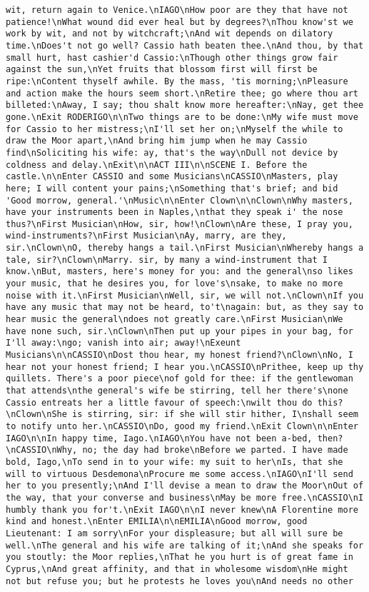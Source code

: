 \begin{verbatim}
wit, return again to Venice.\nIAGO\nHow poor are they that have not patience!\nWhat wound did ever heal but by degrees?\nThou know'st we work by wit, and not by witchcraft;\nAnd wit depends on dilatory time.\nDoes't not go well? Cassio hath beaten thee.\nAnd thou, by that small hurt, hast cashier'd Cassio:\nThough other things grow fair against the sun,\nYet fruits that blossom first will first be ripe:\nContent thyself awhile. By the mass, 'tis morning;\nPleasure and action make the hours seem short.\nRetire thee; go where thou art billeted:\nAway, I say; thou shalt know more hereafter:\nNay, get thee gone.\nExit RODERIGO\n\nTwo things are to be done:\nMy wife must move for Cassio to her mistress;\nI'll set her on;\nMyself the while to draw the Moor apart,\nAnd bring him jump when he may Cassio find\nSoliciting his wife: ay, that's the way\nDull not device by coldness and delay.\nExit\n\nACT III\n\nSCENE I. Before the castle.\n\nEnter CASSIO and some Musicians\nCASSIO\nMasters, play here; I will content your pains;\nSomething that's brief; and bid 'Good morrow, general.'\nMusic\n\nEnter Clown\n\nClown\nWhy masters, have your instruments been in Naples,\nthat they speak i' the nose thus?\nFirst Musician\nHow, sir, how!\nClown\nAre these, I pray you, wind-instruments?\nFirst Musician\nAy, marry, are they, sir.\nClown\nO, thereby hangs a tail.\nFirst Musician\nWhereby hangs a tale, sir?\nClown\nMarry. sir, by many a wind-instrument that I know.\nBut, masters, here's money for you: and the general\nso likes your music, that he desires you, for love's\nsake, to make no more noise with it.\nFirst Musician\nWell, sir, we will not.\nClown\nIf you have any music that may not be heard, to't\nagain: but, as they say to hear music the general\ndoes not greatly care.\nFirst Musician\nWe have none such, sir.\nClown\nThen put up your pipes in your bag, for I'll away:\ngo; vanish into air; away!\nExeunt Musicians\n\nCASSIO\nDost thou hear, my honest friend?\nClown\nNo, I hear not your honest friend; I hear you.\nCASSIO\nPrithee, keep up thy quillets. There's a poor piece\nof gold for thee: if the gentlewoman that attends\nthe general's wife be stirring, tell her there's\none Cassio entreats her a little favour of speech:\nwilt thou do this?\nClown\nShe is stirring, sir: if she will stir hither, I\nshall seem to notify unto her.\nCASSIO\nDo, good my friend.\nExit Clown\n\nEnter IAGO\n\nIn happy time, Iago.\nIAGO\nYou have not been a-bed, then?\nCASSIO\nWhy, no; the day had broke\nBefore we parted. I have made bold, Iago,\nTo send in to your wife: my suit to her\nIs, that she will to virtuous Desdemona\nProcure me some access.\nIAGO\nI'll send her to you presently;\nAnd I'll devise a mean to draw the Moor\nOut of the way, that your converse and business\nMay be more free.\nCASSIO\nI humbly thank you for't.\nExit IAGO\n\nI never knew\nA Florentine more kind and honest.\nEnter EMILIA\n\nEMILIA\nGood morrow, good Lieutenant: I am sorry\nFor your displeasure; but all will sure be well.\nThe general and his wife are talking of it;\nAnd she speaks for you stoutly: the Moor replies,\nThat he you hurt is of great fame in Cyprus,\nAnd great affinity, and that in wholesome wisdom\nHe might not but refuse you; but he protests he loves you\nAnd needs no other 
\end{verbatim}
